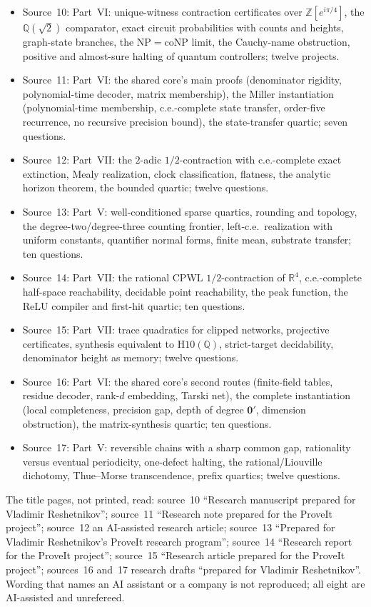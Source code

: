 \documentclass[11pt,letterpaper]{article}
\numberwithin{equation}{section}
\theoremstyle{definition}
\theoremstyle{remark}
\newcommand{\Z}{\mathbb Z}
\newcommand{\Q}{\mathbb Q}
\newcommand{\R}{\mathbb R}
\newcommand{\Hten}{\mathrm{H10}(\Q)}
\begin{document}
\begin{itemize}
\item Source~10: Part~VI: unique-witness contraction certificates over $\Z[e^{i\pi/4}]$, the $\Q(\sqrt2)$ comparator, exact circuit probabilities with counts and heights, graph-state branches, the $\mathrm{NP}=\mathrm{coNP}$ limit, the Cauchy-name obstruction, positive and almost-sure halting of quantum controllers; twelve projects.
\item Source~11: Part~VI: the shared core's main proofs (denominator rigidity, polynomial-time decoder, matrix membership), the Miller instantiation (polynomial-time membership, c.e.-complete state transfer, order-five recurrence, no recursive precision bound), the state-transfer quartic; seven questions.
\item Source~12: Part~VII: the $2$-adic $1/2$-contraction with c.e.-complete exact extinction, Mealy realization, clock classification, flatness, the analytic horizon theorem, the bounded quartic; twelve questions.
\item Source~13: Part~V: well-conditioned sparse quartics, rounding and topology, the degree-two/degree-three counting frontier, left-c.e.\ realization with uniform constants, quantifier normal forms, finite mean, substrate transfer; ten questions.
\item Source~14: Part~VII: the rational CPWL $1/2$-contraction of $\R^4$, c.e.-complete half-space reachability, decidable point reachability, the peak function, the ReLU compiler and first-hit quartic; ten questions.
\item Source~15: Part~VII: trace quadratics for clipped networks, projective certificates, synthesis equivalent to $\Hten$, strict-target decidability, denominator height as memory; twelve questions.
\item Source~16: Part~VI: the shared core's second routes (finite-field tables, residue decoder, rank-$d$ embedding, Tarski net), the complete instantiation (local completeness, precision gap, depth of degree $\mathbf0'$, dimension obstruction), the matrix-synthesis quartic; ten questions.
\item Source~17: Part~V: reversible chains with a sharp common gap, rationality versus eventual periodicity, one-defect halting, the rational/Liouville dichotomy, Thue--Morse transcendence, prefix quartics; twelve questions.
\end{itemize}

The title pages, not printed, read: source~10 ``Research manuscript prepared for
Vladimir Reshetnikov''; source~11 ``Research note prepared for the ProveIt
project''; source~12 an AI-assisted research article; source~13 ``Prepared for
Vladimir Reshetnikov's ProveIt research program''; source~14 ``Research report
for the ProveIt project''; source~15 ``Research article prepared for the ProveIt
project''; sources~16 and~17 research drafts ``prepared for Vladimir
Reshetnikov''. Wording that names an AI assistant or a company is not
reproduced; all eight are AI-assisted and unrefereed.
\end{document}
